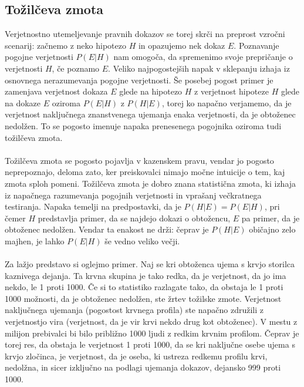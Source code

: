 \documentclass[12pt,a4paper]{amsart}
\theoremstyle{definition} %
\theoremstyle{plain} %
\begin{document}
\subsection{Tožilčeva zmota}
Verjetnostno utemeljevanje pravnih dokazov se torej skrči na preprost vzročni scenarij: začnemo z neko hipotezo $H$ in opazujemo nek dokaz $E$.
Poznavanje pogojne verjetnosti $P(E \lvert H)$ nam omogoča, da spremenimo svoje prepričanje o verjetnosti $H$, če poznamo $E$. Veliko najpogostejših
napak v sklepanju izhaja iz osnovnega nerazumevanja pogojne verjetnosti. Še posebej pogost primer je zamenjava verjetnost dokaza $E$ glede na
hipotezo $H$ z verjetnost hipoteze $H$ glede na dokaze $E$ oziroma $P(E \lvert H)$ z $P(H \lvert E)$, torej ko napačno verjamemo, da je verjetnost 
naključnega znanstvenega ujemanja enaka verjetnosti, da je obtoženec nedolžen. To se pogosto imenuje napaka prenesenega pogojnika oziroma tudi 
tožilčeva zmota.\\\\
Tožilčeva zmota se pogosto pojavlja v kazenskem pravu, vendar jo pogosto neprepoznajo, deloma zato, ker preiskovalci
nimajo močne intuicije o tem, kaj zmota sploh pomeni. Tožilčeva zmota je dobro znana statistična zmota, ki izhaja iz napačnega razumevanja
pogojnih verjetnosti in vprašanj večkratnega testiranja. Napaka temelji na predpostavki, da je $P(H \lvert E) = P(E \lvert H)$, pri čemer $H$
predstavlja primer, da se najdejo dokazi o obtožencu, $E$ pa primer, da je obtoženec nedolžen. Vendar ta enakost ne drži: čeprav je $P(H \lvert E)$
običajno zelo majhen, je lahko $P(E \lvert H)$ še vedno veliko večji. \\\\
Za lažjo predstavo si oglejmo primer. Naj se kri obtoženca ujema s krvjo storilca kaznivega dejanja. Ta krvna skupina je tako redka, 
da je verjetnost, da jo ima nekdo, le 1 proti 1000. Če si to statistiko razlagate tako, da obstaja le 1 proti 1000 možnosti, da je obtoženec 
nedolžen, ste žrtev tožilske zmote. Verjetnost naključnega ujemanja (pogostost krvnega profila) ste napačno združili z verjetnostjo vira (verjetnost, 
da je vir krvi nekdo drug kot obtoženec). V mestu z milijon prebivalci bi bilo približno 1000 ljudi z redkim krvnim profilom. Čeprav je torej 
res, da obstaja le verjetnost 1 proti 1000, da se kri naključne osebe ujema s krvjo zločinca, je verjetnost, da je oseba, ki ustreza redkemu 
profilu krvi, nedolžna, in sicer izključno na podlagi ujemanja dokazov, dejansko 999 proti 1000. \\\\
\end{document}
